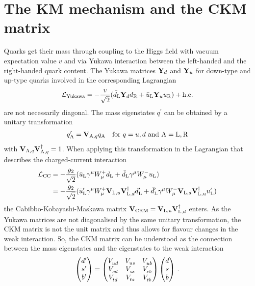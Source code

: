 
\section{The KM mechanism and the CKM matrix}
\label{sec:cpviolation:kmmechanism}

Quarks get their mass through coupling to the Higgs field with vacuum
expectation value $v$ and via Yukawa interaction between the left-handed and
the right-handed quark content. The Yukawa matrices $\mathbf{Y}_d$ and
$\mathbf{Y}_u$ for down-type and up-type quarks involved in the corresponding
Lagrangian
\begin{align}
	\mathcal{L}_{\textrm{Yukawa}} = - \frac{v}{\sqrt{2}} (\bar{d}_{\mathrm{L}} \mathbf{Y}_d d_{\mathrm{R}} + \bar{u}_{\mathrm{L}} \mathbf{Y}_u u_{\mathrm{R}}) + \text{h.c.}
\end{align}
are not necessarily diagonal. The mass eigenstates $q^{\prime}$ can be
obtained by a unitary transformation
\begin{align}
	q^{\prime}_{\mathrm{A}} = \mathbf{V}_{\mathrm{A,}q}q_{\mathrm{A}} \quad \text{for } q = u,d \text{ and } \mathrm{A} = \mathrm{L,R}
\end{align}
with $\mathbf{V}_{\mathrm{A,}q}\mathbf{V}^\dagger_{\mathrm{A,}q} = 1$. When
applying this transformation in the Lagrangian that describes the
charged-current interaction
\begin{align}
	\mathcal{L}_{\textrm{CC}} &= -\frac{g_2}{\sqrt{2}}(\bar{u}_{\mathrm{L}}\gamma^{\mu}W_{\mu}^+ d_{\mathrm{L}} + \bar{d}_{\mathrm{L}}\gamma^{\mu}W_{\mu}^-u_{\mathrm{L}})\\
	&= -\frac{g_2}{\sqrt{2}}(\bar{u}^\prime_{\mathrm{L}}\gamma^{\mu}W_{\mu}^+\mathbf{V}_{\mathrm{L,}u}\mathbf{V}^\dagger_{\mathrm{L,}d}d^\prime_{\mathrm{L}} + \bar{d}^\prime_{\mathrm{L}}\gamma^{\mu}W_{\mu}^-\mathbf{V}_{\mathrm{L,}d}\mathbf{V}^\dagger_{\mathrm{L,}u}u^\prime_{\mathrm{L}})
\end{align}
the Cabibbo-Kobayashi-Maskawa matrix $\mathbf{V}_{\text{CKM}} =
\mathbf{V}_{\mathrm{L,}u}\mathbf{V}^\dagger_{\mathrm{L,}d}$ enters. As the
Yukawa matrices are not diagonalised by the same unitary transformation, the
CKM matrix is not the unit matrix and thus allows for flavour changes in the
weak interaction. So, the CKM matrix can be understood as the connection
between the mass eigenstates and the eigenstates to the weak interaction
\begin{align}
\begin{pmatrix}
d^\prime \\ s^\prime \\ b^\prime
\end{pmatrix}
=
\begin{pmatrix}
{\ensuremath{V_{{u}{d}}^{}}} & {V_{{u}{s}}^{}} & {V_{{u}{b}}^{}} \\
{V_{{c}{d}}^{}} & {V_{{c}{s}}^{}} & {V_{{c}{b}}^{}} \\
{V_{{t}{d}}^{}} & {V_{{t}{s}}^{}} & {V_{{t}{b}}^{}} \\
\end{pmatrix}
\begin{pmatrix}
d	\\	s	\\	b
\end{pmatrix}
\,.
\end{align}
